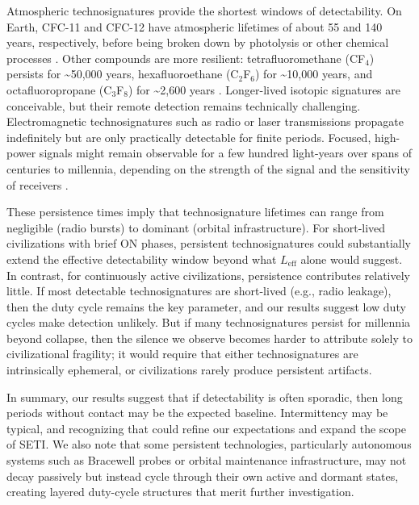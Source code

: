 Atmospheric technosignatures provide the shortest windows of detectability. On Earth, CFC-11 and CFC-12 have atmospheric lifetimes of about 55 and 140 years, respectively, before being broken down by photolysis or other chemical processes \citep{NOAA-GML-lz}. Other compounds are more resilient: tetrafluoromethane (CF$_4$) persists for \textasciitilde50,000 years, hexafluoroethane (C$_2$F$_6$) for \textasciitilde10,000 years, and octafluoropropane (C$_3$F$_8$) for \textasciitilde2,600 years \citep{Trudinger2016-ky}. Longer-lived isotopic signatures are conceivable, but their remote detection remains technically challenging. Electromagnetic technosignatures such as radio or laser transmissions propagate indefinitely but are only practically detectable for finite periods. Focused, high-power signals might remain observable for a few hundred light-years over spans of centuries to millennia, depending on the strength of the signal and the sensitivity of receivers \citep{Sheikh2025-td}.

These persistence times imply that technosignature lifetimes can range from negligible (radio bursts) to dominant (orbital infrastructure). For short-lived civilizations with brief ON phases, persistent technosignatures could substantially extend the effective detectability window beyond what $L_{\mathrm{eff}}$ alone would suggest. In contrast, for continuously active civilizations, persistence contributes relatively little. If most detectable technosignatures are short-lived (e.g., radio leakage), then the duty cycle remains the key parameter, and our results suggest low duty cycles make detection unlikely. But if many technosignatures persist for millennia beyond collapse, then the silence we observe becomes harder to attribute solely to civilizational fragility; it would require that either technosignatures are intrinsically ephemeral, or civilizations rarely produce persistent artifacts.

In summary, our results suggest that if detectability is often sporadic, then long periods without contact may be the expected baseline. Intermittency may be typical, and recognizing that could refine our expectations and expand the scope of SETI. We also note that some persistent technologies, particularly autonomous systems such as Bracewell probes \citep{Bracewell1960-bp} or orbital maintenance infrastructure, may not decay passively but instead cycle through their own active and dormant states, creating layered duty-cycle structures that merit further investigation.
